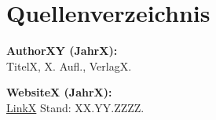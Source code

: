 \noindent

\section{Quellenverzeichnis}
\textbf{AuthorXY (JahrX):} \\
\noindent
TitelX, X. Aufl., VerlagX.
\bigbreak

\noindent
\textbf{WebsiteX (JahrX):} \\
\noindent
\url{LinkX}
\break
Stand: XX.YY.ZZZZ.
\bigbreak
